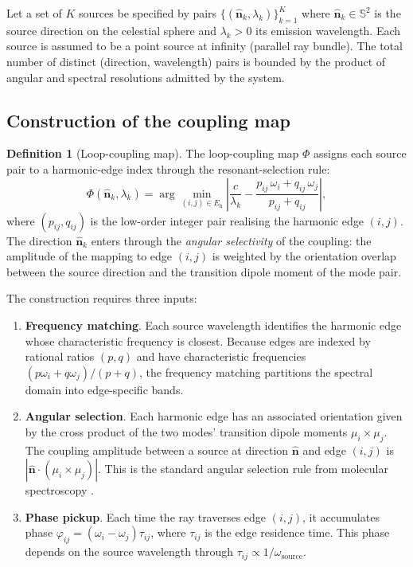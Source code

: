 \documentclass[11pt,twocolumn,a4paper]{article}
\theoremstyle{definition}
\newtheorem{definition}[theorem]{Definition}
\theoremstyle{remark}
\newcommand{\HarmSet}{E_{\mathrm{h}}}
\begin{document}
Let a set of $K$ sources be specified by pairs $\{(\hat{\mathbf{n}}_k, \lambda_k)\}_{k=1}^K$ where $\hat{\mathbf{n}}_k \in \mathbb{S}^2$ is the source direction on the celestial sphere and $\lambda_k > 0$ its emission wavelength. Each source is assumed to be a point source at infinity (parallel ray bundle). The total number of distinct (direction, wavelength) pairs is bounded by the product of angular and spectral resolutions admitted by the system.

\subsection{Construction of the coupling map}

\begin{definition}[Loop-coupling map]
\label{def:coupling_map}
The loop-coupling map $\Phi$ assigns each source pair to a harmonic-edge index through the resonant-selection rule:
\begin{equation}
\label{eq:coupling_map}
\Phi(\hat{\mathbf{n}}_k, \lambda_k) = \arg\min_{(i,j) \in \HarmSet} \left| \frac{c}{\lambda_k} - \frac{p_{ij}\, \omega_i + q_{ij}\, \omega_j}{p_{ij} + q_{ij}} \right|,
\end{equation}
where $(p_{ij}, q_{ij})$ is the low-order integer pair realising the harmonic edge $(i,j)$. The direction $\hat{\mathbf{n}}_k$ enters through the \emph{angular selectivity} of the coupling: the amplitude of the mapping to edge $(i,j)$ is weighted by the orientation overlap between the source direction and the transition dipole moment of the mode pair.
\end{definition}

The construction requires three inputs:

\begin{enumerate}[nosep]
\item \textbf{Frequency matching}. Each source wavelength identifies the harmonic edge whose characteristic frequency is closest. Because edges are indexed by rational ratios $(p, q)$ and have characteristic frequencies $(p\omega_i + q\omega_j)/(p+q)$, the frequency matching partitions the spectral domain into edge-specific bands.
\item \textbf{Angular selection}. Each harmonic edge has an associated orientation given by the cross product of the two modes' transition dipole moments $\mu_i \times \mu_j$. The coupling amplitude between a source at direction $\hat{\mathbf{n}}$ and edge $(i,j)$ is $|\hat{\mathbf{n}} \cdot (\mu_i \times \mu_j)|$. This is the standard angular selection rule from molecular spectroscopy \citep{zare1988}.
\item \textbf{Phase pickup}. Each time the ray traverses edge $(i,j)$, it accumulates phase $\varphi_{ij} = (\omega_i - \omega_j)\tau_{ij}$, where $\tau_{ij}$ is the edge residence time. This phase depends on the source wavelength through $\tau_{ij} \propto 1/\omega_{\mathrm{source}}$.
\end{enumerate}
\end{document}
